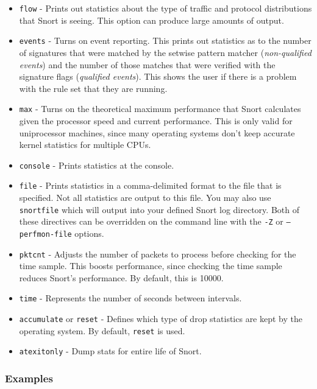 \documentclass[english]{report}
\begin{document}
\begin{itemize}
\item \texttt{flow} - Prints out statistics about the type
of traffic and protocol distributions that Snort is seeing. This option can
produce large amounts of output.

\item \texttt{events} - Turns on event reporting.  This prints out statistics as
to the number of signatures that were matched by the setwise pattern matcher 
(\textit{non-qualified events}) and the number of those matches that were 
verified with the signature flags (\textit{qualified events}).
This shows the user if there
is a problem with the rule set that they are running.

\item \texttt{max} - Turns on the theoretical maximum performance that Snort
calculates given the processor speed and current performance.  This is only
valid for uniprocessor machines, since many operating systems don't keep
accurate kernel statistics for multiple CPUs.  

\item \texttt{console} - Prints statistics at the console.

\item \texttt{file} - Prints statistics in a comma-delimited format to the file
that is specified.  Not all statistics are output to this file.  You may
also use \texttt{snortfile} which will output into your defined Snort log
directory.  Both of these directives can be overridden on the command
line with the \texttt{-Z} or \texttt{--perfmon-file} options.

\item \texttt{pktcnt} - Adjusts the number of packets to process before checking for
the time sample.  This boosts performance, since checking the time sample
reduces Snort's performance.  By default, this is 10000.  

\item \texttt{time} - Represents the number of seconds between intervals.

\item \texttt{accumulate} or \texttt{reset} - Defines which type of drop statistics
are kept by the operating system. By default, \texttt{reset} is used.

\item \texttt{atexitonly} - Dump stats for entire life of Snort.

\end{itemize}
\subsubsection{Examples}
\end{document}
